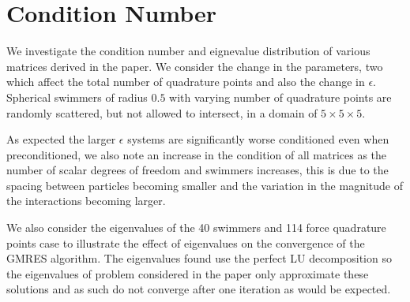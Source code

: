 \FloatBarrier
\section{Condition Number}\label{appendix:ConNum}
We investigate the condition number and eignevalue distribution of various matrices derived in the paper. We consider the change in the parameters, two which affect the total number of quadrature points and also the change in $\epsilon$. Spherical swimmers of radius $0.5$ with varying number of quadrature points are randomly scattered, but not allowed to intersect, in a domain of $5 \times 5 \times 5$. 

As expected the larger $\epsilon$ systems are significantly worse conditioned even when preconditioned, we also note an increase in the condition of all matrices as the number of scalar degrees of freedom and swimmers increases, this is due to the spacing between particles becoming smaller and the variation in the magnitude of the interactions becoming larger. 

We also consider the eigenvalues of the 40 swimmers and 114 force quadrature points case to illustrate the effect of eigenvalues on the convergence of the GMRES algorithm. The eigenvalues found use the perfect LU decomposition so the eigenvalues of problem considered in the paper only approximate these solutions and as such do not converge after one iteration as would be expected. 


